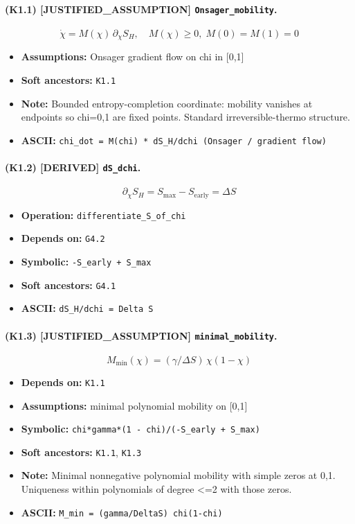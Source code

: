 \documentclass[11pt,a4paper]{article}
\theoremstyle{remark}\newtheorem*{caution}{Caution}
\newcommand{\tagbox}[1]{\textsc{[#1]}}
\begin{document}
\paragraph{(K1.1) \tagbox{JUSTIFIED\_ASSUMPTION} \texttt{Onsager\_mobility}.}
\begin{equation}
\dot\chi=M(\chi)\,\partial_\chi S_H,\quad M(\chi)\ge 0,\; M(0)=M(1)=0
\tag{K1.1}
\end{equation}
\begin{itemize}\setlength{\itemsep}{0.12em}
\item \textbf{Assumptions:} Onsager gradient flow on chi in [0,1]
\item \textbf{Soft ancestors:} \texttt{K1.1}
\item \textbf{Note:} Bounded entropy-completion coordinate: mobility vanishes at endpoints so chi=0,1 are fixed points. Standard irreversible-thermo structure.
\item \textbf{ASCII:} \texttt{chi\_dot = M(chi) * dS\_H/dchi  (Onsager / gradient flow)}
\end{itemize}
\paragraph{(K1.2) \tagbox{DERIVED} \texttt{dS\_dchi}.}
\begin{equation}
\partial_\chi S_H=S_{\max}-S_{\mathrm{early}}=\Delta S
\tag{K1.2}
\end{equation}
\begin{itemize}\setlength{\itemsep}{0.12em}
\item \textbf{Operation:} \texttt{differentiate\_S\_of\_chi}
\item \textbf{Depends on:} \texttt{G4.2}
\item \textbf{Symbolic:} \texttt{-S\_early + S\_max}
\item \textbf{Soft ancestors:} \texttt{G4.1}
\item \textbf{ASCII:} \texttt{dS\_H/dchi = Delta S}
\end{itemize}
\paragraph{(K1.3) \tagbox{JUSTIFIED\_ASSUMPTION} \texttt{minimal\_mobility}.}
\begin{equation}
M_{\mathrm{min}}(\chi)=(\gamma/\Delta S)\,\chi(1-\chi)
\tag{K1.3}
\end{equation}
\begin{itemize}\setlength{\itemsep}{0.12em}
\item \textbf{Depends on:} \texttt{K1.1}
\item \textbf{Assumptions:} minimal polynomial mobility on [0,1]
\item \textbf{Symbolic:} \texttt{chi*gamma*(1 - chi)/(-S\_early + S\_max)}
\item \textbf{Soft ancestors:} \texttt{K1.1}, \texttt{K1.3}
\item \textbf{Note:} Minimal nonnegative polynomial mobility with simple zeros at 0,1. Uniqueness within polynomials of degree <=2 with those zeros.
\item \textbf{ASCII:} \texttt{M\_min = (gamma/DeltaS) chi(1-chi)}
\end{itemize}
\end{document}
